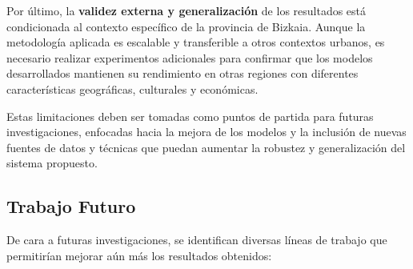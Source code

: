 Por último, la \textbf{validez externa y generalización} de los resultados está condicionada al contexto específico de la provincia de Bizkaia. Aunque la metodología aplicada es escalable y transferible a otros contextos urbanos, es necesario realizar experimentos adicionales para confirmar que los modelos desarrollados mantienen su rendimiento en otras regiones con diferentes características geográficas, culturales y económicas.

Estas limitaciones deben ser tomadas como puntos de partida para futuras investigaciones, enfocadas hacia la mejora de los modelos y la inclusión de nuevas fuentes de datos y técnicas que puedan aumentar la robustez y generalización del sistema propuesto.

\subsection{Trabajo Futuro}
\label{sec:trabajo_futuro}

De cara a futuras investigaciones, se identifican diversas líneas de trabajo que permitirían mejorar aún más los resultados obtenidos:

